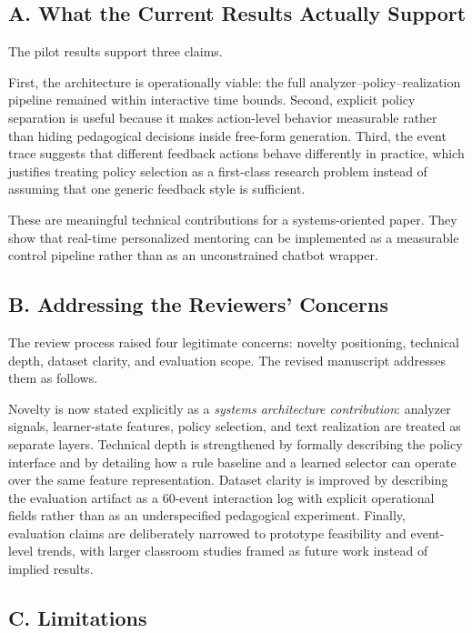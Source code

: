﻿\documentclass[conference]{IEEEtran}
\begin{document}
\subsection*{A. What the Current Results Actually Support}

The pilot results support three claims.

First, the architecture is operationally viable: the full analyzer--policy--realization pipeline remained within interactive time bounds. Second, explicit policy separation is useful because it makes action-level behavior measurable rather than hiding pedagogical decisions inside free-form generation. Third, the event trace suggests that different feedback actions behave differently in practice, which justifies treating policy selection as a first-class research problem instead of assuming that one generic feedback style is sufficient.

These are meaningful technical contributions for a systems-oriented paper. They show that real-time personalized mentoring can be implemented as a measurable control pipeline rather than as an unconstrained chatbot wrapper.

\subsection*{B. Addressing the Reviewers' Concerns}

The review process raised four legitimate concerns: novelty positioning, technical depth, dataset clarity, and evaluation scope. The revised manuscript addresses them as follows.

Novelty is now stated explicitly as a \emph{systems architecture contribution}: analyzer signals, learner-state features, policy selection, and text realization are treated as separate layers. Technical depth is strengthened by formally describing the policy interface and by detailing how a rule baseline and a learned selector can operate over the same feature representation. Dataset clarity is improved by describing the evaluation artifact as a 60-event interaction log with explicit operational fields rather than as an underspecified pedagogical experiment. Finally, evaluation claims are deliberately narrowed to prototype feasibility and event-level trends, with larger classroom studies framed as future work instead of implied results.

\subsection*{C. Limitations}
\end{document}
